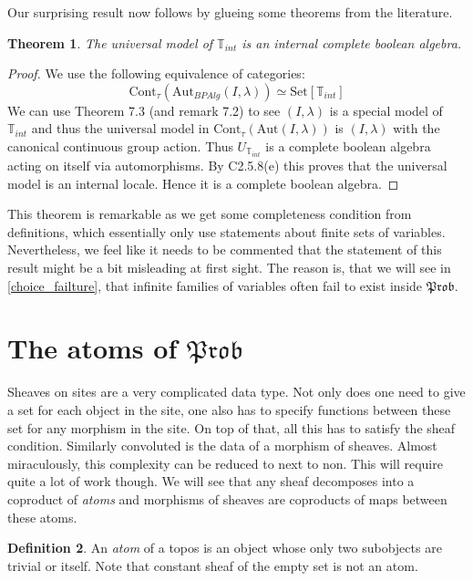 \documentclass[a4paper]{amsproc}
\theoremstyle{plain}
\newtheorem{theorem}{Theorem}[section]
\theoremstyle{definition}
\newtheorem{definition}[theorem]{Definition}
\theoremstyle{remark}
\numberwithin{equation}{section}
\begin{document}
Our surprising result now follows by glueing some theorems from the literature.

\begin{theorem} The universal model of $\mathbb{T}_{int}$ is an internal complete boolean algebra.
\end{theorem}
\begin{proof} 
We use the following equivalence of categories:
\[ \text{Cont}_\tau(\text{Aut}_{BPAlg}(I,\lambda))\simeq \text{Set}[\mathbb{T}_{int}]  \]
We can use Theorem 7.3 (and remark 7.2) \cite{caramello_lafforgue} %
 to see $(I,\lambda)$ is a special model of $\mathbb{T}_{int}$ and thus the universal model in $\text{Cont}_\tau(\text{Aut}(I,\lambda))$ is $(I,\lambda)$ with the canonical continuous group action.\newline 
\indent Thus $U_{\mathbb{T}_{int}}$ is a complete boolean algebra acting on itself via automorphisms.  By C2.5.8(e) \cite{elephant} this proves that the universal model is an internal locale. Hence it is a complete boolean algebra.
\end{proof}

This theorem is remarkable as we get some completeness condition from definitions, which essentially only use statements about finite sets of variables. Nevertheless, we feel like it needs to be commented that the statement of this result might be a bit misleading at first sight. The reason is, that we will see in \ref{choice_failture}, that infinite families of variables often fail to exist inside $\mathfrak{Prob}$.


\section{The atoms of $\mathfrak{Prob}$ }
Sheaves on sites are a very complicated data type. Not only does one need to give a set for each object in the site, one also has to specify functions between these set for any morphism in the site. On top of that, all this has to satisfy the sheaf condition. Similarly convoluted is the data of a morphism of sheaves.\newline
\indent Almost miraculously, this complexity can be reduced to next to non. This will require quite a lot of work though. We will see that any sheaf decomposes into a coproduct of \emph{atoms} and morphisms of sheaves are coproducts of maps between these atoms.
\begin{definition} An \emph{atom} of a topos is an object whose only two subobjects are trivial or itself. Note that constant sheaf of the empty set is not an atom.
\end{definition}
\end{document}
